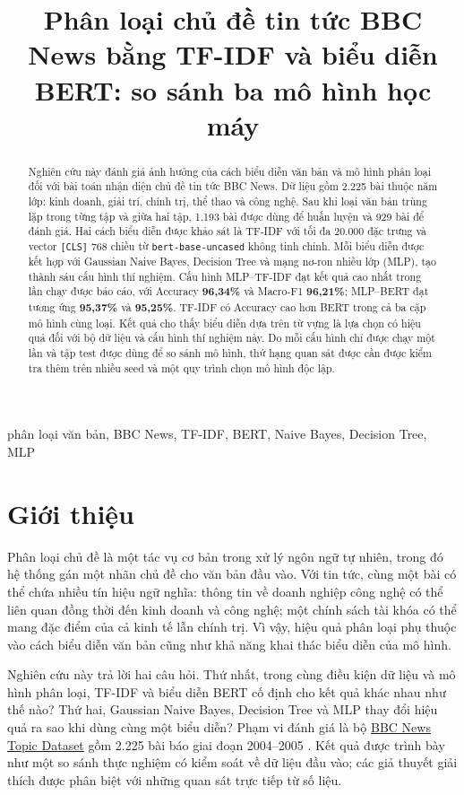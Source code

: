 \documentclass[conference,a4paper]{IEEEtran}
\title{Phân loại chủ đề tin tức BBC News bằng TF-IDF và biểu diễn BERT: so sánh ba mô hình học máy}
\author{
\IEEEauthorblockN{Nguyễn Gia An \quad Nông Chí Thiện}
\IEEEauthorblockA{
Trường Đại học Bách Khoa, Đại học Quốc gia Thành phố Hồ Chí Minh\\
Bài tập lớn môn Học máy (CO3117), học kỳ HK261, năm học 2026--2027\\
Giảng viên hướng dẫn: Trương Vĩnh Lân
}
}
\begin{document}
\maketitle

\begin{abstract}
Nghiên cứu này đánh giá ảnh hưởng của cách biểu diễn văn bản và mô hình phân loại đối với bài toán nhận diện chủ đề tin tức BBC News. Dữ liệu gồm 2.225 bài thuộc năm lớp: kinh doanh, giải trí, chính trị, thể thao và công nghệ. Sau khi loại văn bản trùng lặp trong từng tập và giữa hai tập, 1.193 bài được dùng để huấn luyện và 929 bài để đánh giá. Hai cách biểu diễn được khảo sát là TF-IDF với tối đa 20.000 đặc trưng và vector \texttt{[CLS]} 768 chiều từ \texttt{bert-base-uncased} không tinh chỉnh. Mỗi biểu diễn được kết hợp với Gaussian Naive Bayes, Decision Tree và mạng nơ-ron nhiều lớp (MLP), tạo thành sáu cấu hình thí nghiệm. Cấu hình MLP--TF-IDF đạt kết quả cao nhất trong lần chạy được báo cáo, với Accuracy \textbf{96,34\%} và Macro-F1 \textbf{96,21\%}; MLP--BERT đạt tương ứng \textbf{95,37\%} và \textbf{95,25\%}. TF-IDF có Accuracy cao hơn BERT trong cả ba cặp mô hình cùng loại. Kết quả cho thấy biểu diễn dựa trên từ vựng là lựa chọn có hiệu quả đối với bộ dữ liệu và cấu hình thí nghiệm này. Do mỗi cấu hình chỉ được chạy một lần và tập test được dùng để so sánh mô hình, thứ hạng quan sát được cần được kiểm tra thêm trên nhiều seed và một quy trình chọn mô hình độc lập.

\end{abstract}
\begin{IEEEkeywords}
phân loại văn bản, BBC News, TF-IDF, BERT, Naive Bayes, Decision Tree, MLP
\end{IEEEkeywords}

\section{Giới thiệu}

Phân loại chủ đề là một tác vụ cơ bản trong xử lý ngôn ngữ tự nhiên, trong đó hệ thống gán một nhãn chủ đề cho văn bản đầu vào. Với tin tức, cùng một bài có thể chứa nhiều tín hiệu ngữ nghĩa: thông tin về doanh nghiệp công nghệ có thể liên quan đồng thời đến kinh doanh và công nghệ; một chính sách tài khóa có thể mang đặc điểm của cả kinh tế lẫn chính trị. Vì vậy, hiệu quả phân loại phụ thuộc vào cách biểu diễn văn bản cũng như khả năng khai thác biểu diễn của mô hình.

Nghiên cứu này trả lời hai câu hỏi. Thứ nhất, trong cùng điều kiện dữ liệu và mô hình phân loại, TF-IDF và biểu diễn BERT cố định cho kết quả khác nhau như thế nào? Thứ hai, Gaussian Naive Bayes, Decision Tree và MLP thay đổi hiệu quả ra sao khi dùng cùng một biểu diễn? Phạm vi đánh giá là bộ \href{https://huggingface.co/datasets/SetFit/bbc-news}{BBC News Topic Dataset} gồm 2.225 bài báo giai đoạn 2004--2005 \cite{setfit_bbc}. Kết quả được trình bày như một so sánh thực nghiệm có kiểm soát về dữ liệu đầu vào; các giả thuyết giải thích được phân biệt với những quan sát trực tiếp từ số liệu.
\end{document}

